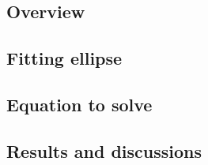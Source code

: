 \subsection{Overview}


\subsection{Fitting ellipse}


\subsection{Equation to solve}


\subsection{Results and discussions}
